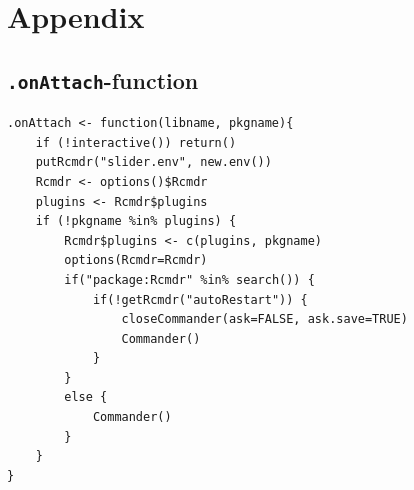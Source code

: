 \documentclass[a4paper]{article}\usepackage[]{graphicx}\usepackage[]{color}
\begin{document}
\newpage





\newpage
\section{Appendix}
\subsection{\texttt{.onAttach}-function}
\begin{verbatim}
.onAttach <- function(libname, pkgname){
    if (!interactive()) return()
    putRcmdr("slider.env", new.env())    
    Rcmdr <- options()$Rcmdr
    plugins <- Rcmdr$plugins
    if (!pkgname %in% plugins) {
        Rcmdr$plugins <- c(plugins, pkgname)
        options(Rcmdr=Rcmdr)
        if("package:Rcmdr" %in% search()) {
            if(!getRcmdr("autoRestart")) {
                closeCommander(ask=FALSE, ask.save=TRUE)
                Commander()
            }
        }
        else {
            Commander()
        }
    }
}

\end{verbatim}
\end{document}
